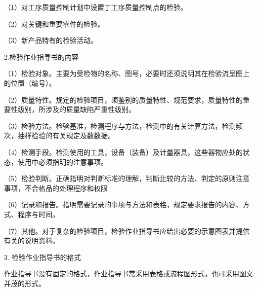     （1）对工序质量控制计划中设置丁工序质量控制点的检验。

    （2）对关键和重要零件的检验。

    （3）新产品特有的检验活动。

    2.检验作业指寻书的内容

    （1）检验对象。主要为受检物的名称、图号，必要时还须说明其在检验流呈图上的位置（编号）。

    （2）质量特性。规定的检验项目，须鉴别的质量特性、规范要求，质量特性的重要性级别，所涉及的质量缺陷严重性级别。

    （3）检验方法。检验基准，检测程序与方法，检测中的有关计算方法，检测频次，抽样检验的有关规定及数数据。

    （4）检测手段。检测使用的工具，设备（装备）及计量器具，这些器物应处的状态，使用中必须指明的注意事项。

    （5）检验判断。正确指明对判断标准的理解，判断比较的方法、判定的原则注意事项，不合格品的处理程序和权限

    （6）记录和报告。指明需要记录的事项与方法和表格，规定要求报告的内容、方式、程序与时间。

    （7）其他。对于复杂的检验项目，检验作业指导书应给出必要的示意图表并提供有关的说明资料。

    3. 检验作业指导书的格式

    作业指导书没有固定的格式，作业指导书常采用表格或流程图形式，也可采用图文并茂的形式。
